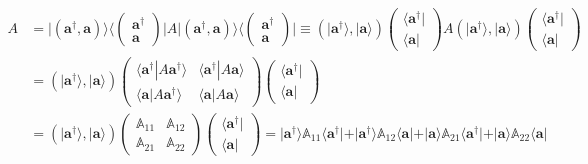 \documentclass[aps, preprint]{revtex4}
\begin{document}
\begin{align}A &  =\vert \overset{\overset{}{}}{\left (\mathbf{a}^{ \dag } ,\mathbf{a}\right )} \rangle  \langle \left (\begin{array}{c}\mathbf{a}^{ \dag } \\
\mathbf{a}\end{array}\right )\vert A\vert \overset{\overset{}{}}{\left (\mathbf{a}^{ \dag } ,\mathbf{a}\right )} \rangle  \langle \left (\begin{array}{c}\mathbf{a}^{ \dag } \\
\mathbf{a}\end{array}\right )\vert  \equiv \left (\vert \mathbf{a}^{ \dag } \rangle  ,\vert \mathbf{a} \rangle \right )\left (\begin{array}{c} \langle \mathbf{a}^{ \dag }\vert  \\
 \langle \mathbf{a}\vert \end{array}\right ) A \left (\vert \mathbf{a}^{ \dag } \rangle  ,\vert \mathbf{a} \rangle \right ) \left (\begin{array}{c} \langle \mathbf{a}^{ \dag }\vert  \\
 \langle \mathbf{a}\vert \end{array}\right ) \\
 &  =\left (\vert \mathbf{a}^{ \dag } \rangle  ,\vert \mathbf{a} \rangle \right )\left (\begin{array}{cc} \langle \left .\mathbf{a}^{ \dag }\right \vert A \mathbf{a}^{ \dag } \rangle  &  \langle \left .\mathbf{a}^{ \dag }\right \vert A \mathbf{a} \rangle  \\
 \langle \left .\mathbf{a}\right \vert A \mathbf{a}^{ \dag } \rangle  &  \langle \left .\mathbf{a}\right \vert A \mathbf{a} \rangle \end{array}\right ) \left (\begin{array}{c} \langle \mathbf{a}^{ \dag }\vert  \\
 \langle \mathbf{a}\vert \end{array}\right ) \\
 &  =\left (\vert \mathbf{a}^{ \dag } \rangle  ,\vert \mathbf{a} \rangle \right )\left (\begin{array}{cc}\mathbb{A}_{1 1} & \mathbb{A}_{1 2} \\
\mathbb{A}_{2 1} & \mathbb{A}_{2 2}\end{array}\right ) \left (\begin{array}{c} \langle \mathbf{a}^{ \dag }\vert  \\
 \langle \mathbf{a}\vert \end{array}\right ) =\vert \mathbf{a}^{ \dag } \rangle \mathbb{A}_{1 1}  \langle \mathbf{a}^{ \dag }\vert  +\vert \mathbf{a}^{ \dag } \rangle  \mathbb{A}_{1 2}  \langle \mathbf{a}\vert  +\vert \mathbf{a} \rangle  \mathbb{A}_{2 1}  \langle \mathbf{a}^{ \dag }\vert  +\vert \mathbf{a} \rangle  \mathbb{A}_{2 2} \langle \mathbf{a}\vert  \\

\end{align}
\end{document}
